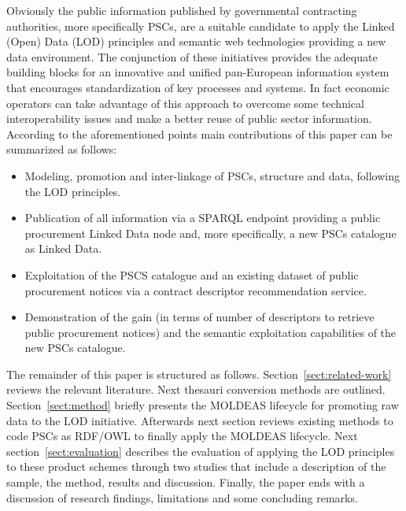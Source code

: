 Obviously the public information published by governmental contracting authorities, more specifically PSCs, are a suitable candidate to apply the Linked (Open) Data 
(LOD) principles and semantic web technologies providing a new data environment. The conjunction of these initiatives provides the adequate building blocks for an 
innovative and unified pan-European information system that encourages standardization of key processes and systems. In fact economic operators can 
take advantage of this approach to overcome some technical interoperability issues and make a better reuse of public sector information. According to the 
aforementioned points main contributions of this paper can be summarized as follows:
\begin{itemize}
\item Modeling, promotion and inter-linkage of PSCs, structure and data, following the LOD principles.
\item Publication of all information via a SPARQL endpoint providing a public procurement Linked Data node and, more specifically, a new PSCs catalogue as Linked Data.
\item Exploitation of the PSCS catalogue and an existing dataset of public procurement notices via a contract descriptor recommendation service.
\item Demonstration of the gain (in terms of number of descriptors to retrieve public procurement notices) and the semantic exploitation 
capabilities of the new PSCs catalogue.
\end{itemize}

The remainder of this paper is structured as follows. Section~\ref{sect:related-work} reviews the relevant literature. Next thesauri 
conversion methods are outlined. Section~\ref{sect:method} briefly presents the MOLDEAS lifecycle for promoting raw data to the LOD initiative. 
Afterwards next section reviews existing methods to code PSCs as RDF/OWL to finally apply the MOLDEAS lifecycle. 
Next section~\ref{sect:evaluation} describes the evaluation of applying the LOD principles to these product 
schemes through two studies that include a description of the sample, the method, results and discussion. Finally, 
the paper ends with a discussion of research findings, limitations and some concluding remarks.
